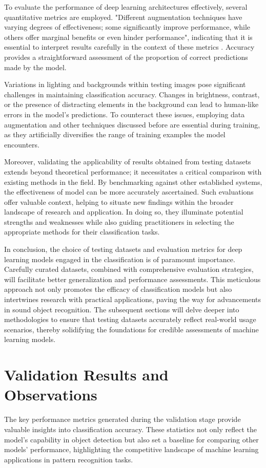 To evaluate the performance of deep learning architectures effectively, several quantitative metrics are employed. "Different augmentation techniques have varying degrees of effectiveness; some significantly improve performance, while others offer marginal benefits or even hinder performance", indicating that it is essential to interpret results carefully in the context of these metrics \cite{lee2021augmentation}. Accuracy provides a straightforward assessment of the proportion of correct predictions made by the model.


Variations in lighting and backgrounds within testing images pose significant challenges in maintaining classification accuracy. Changes in brightness, contrast, or the presence of distracting elements in the background can lead to human-like errors in the model's predictions. To counteract these issues, employing data augmentation and other techniques discussed before are essential during training, as they artificially diversifies the range of training examples the model encounters.


Moreover, validating the applicability of results obtained from testing datasets extends beyond theoretical performance; it necessitates a critical comparison with existing methods in the field. By benchmarking against other established systems, the effectiveness of model can be more accurately ascertained. Such evaluations offer valuable context, helping to situate new findings within the broader landscape of research and application. In doing so, they illuminate potential strengths and weaknesses while also guiding practitioners in selecting the appropriate methods for their classification tasks.


In conclusion, the choice of testing datasets and evaluation metrics for deep learning models engaged in the classification is of paramount importance. Carefully curated datasets, combined with comprehensive evaluation strategies, will facilitate better generalization and performance assessments. This meticulous approach not only promotes the efficacy of classification models but also intertwines research with practical applications, paving the way for advancements in sound object recognition. The subsequent sections will delve deeper into methodologies to ensure that testing datasets accurately reflect real-world usage scenarios, thereby solidifying the foundations for credible assessments of machine learning models.

\section{Validation Results and Observations}
The key performance metrics generated during the validation stage provide valuable insights into classification accuracy. These statistics not only reflect the model's capability in object detection but also set a baseline for comparing other models' performance, highlighting the competitive landscape of machine learning applications in pattern recognition tasks.


